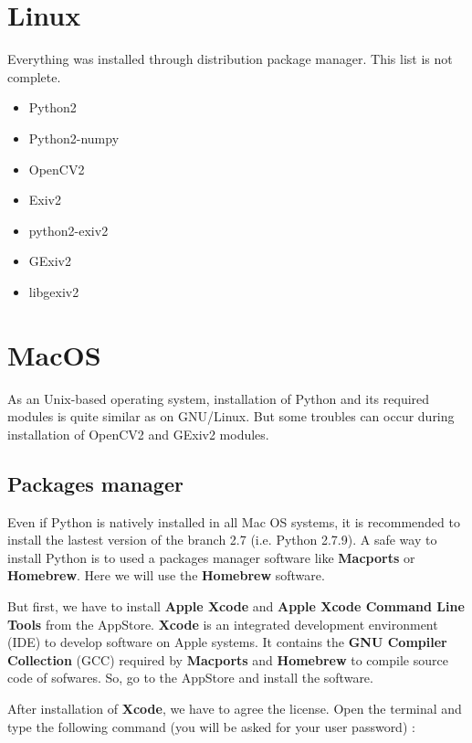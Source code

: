 \documentclass[a4paper, 11pt]{article}
\begin{document}
\section{Linux}
Everything was installed through distribution package manager. This list is not complete.

\begin{itemize}

\item Python2
\item Python2-numpy
\item OpenCV2
\item Exiv2
\item python2-exiv2
\item GExiv2
\item libgexiv2

\end{itemize}

\section{MacOS}

As an Unix-based operating system, installation of Python and its required modules is quite similar as on GNU/Linux. But some troubles can occur during installation of OpenCV2 and GExiv2 modules.

\subsection*{Packages manager}

Even if Python is natively installed in all Mac OS systems, it is recommended to install the lastest version of the branch 2.7 (i.e. Python 2.7.9). A safe way to install Python is to used a packages manager software like \textbf{Macports} or \textbf{Homebrew}. Here we will use the \textbf{Homebrew} software.

But first, we have to install \textbf{Apple Xcode} and \textbf{Apple Xcode Command Line Tools} from the AppStore. \textbf{Xcode} is an integrated development environment (IDE) to develop software on Apple systems. It contains the \textbf{GNU Compiler Collection} (GCC) required by \textbf{Macports} and \textbf{Homebrew} to compile source code of sofwares. So, go to the AppStore and install the software.

After installation of \textbf{Xcode}, we have to agree the license. Open the terminal and type the following command (you will be asked for your user password) :
\end{document}
